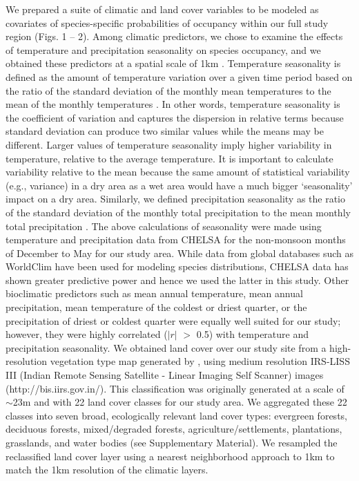 We prepared a suite of climatic and land cover variables to be modeled as covariates of species-specific probabilities of occupancy within our full study region (Figs. 1 -- 2).
Among climatic predictors, we chose to examine the effects of temperature and precipitation seasonality on species occupancy, and we obtained these predictors at a spatial scale of 1km \citep[Climatologies at High resolution for the Earth's Land Surface Areas; CHELSA:][]{karger2017}.
Temperature seasonality is defined as the amount of temperature variation over a given time period based on the ratio of the standard deviation of the monthly mean temperatures to the mean of the monthly temperatures \citep{odonnell2012a}.
In other words, temperature seasonality is the coefficient of variation and captures the dispersion in relative terms because standard deviation can produce two similar values while the means may be different.
Larger values of temperature seasonality imply higher variability in temperature, relative to the average temperature.
It is important to calculate variability relative to the mean because the same amount of statistical variability (e.g., variance) in a dry area as a wet area would have a much bigger `seasonality' impact on a dry area.
Similarly, we defined precipitation seasonality as the ratio of the standard deviation of the monthly total precipitation to the mean monthly total precipitation \citep{odonnell2012a}.
The above calculations of seasonality were made using temperature and precipitation data from CHELSA for the non-monsoon months of December to May for our study area.
While data from global databases such as WorldClim have been used for modeling species distributions, CHELSA data has shown greater predictive power \citep{karger2017} and hence we used the latter in this study.
Other bioclimatic predictors such as mean annual temperature, mean annual precipitation, mean temperature of the coldest or driest quarter, or the precipitation of driest or coldest quarter were equally well suited for our study; however, they were highly correlated ($|r|$ $>$ 0.5) with temperature and precipitation seasonality.
We obtained land cover over our study site from a high-resolution vegetation type map generated by \citep{roy2015}, using medium resolution IRS-LISS III (Indian Remote Sensing Satellite - Linear Imaging Self Scanner) images (http://bis.iirs.gov.in/).
This classification was originally generated at a scale of $\sim$23m and with 22 land cover classes for our study area.
We aggregated these 22 classes into seven broad, ecologically relevant land cover types: evergreen forests, deciduous forests, mixed/degraded forests, agriculture/settlements, plantations, grasslands, and water bodies (see Supplementary Material).
We resampled the reclassified land cover layer using a nearest neighborhood approach to 1km to match the 1km resolution of the climatic layers.

